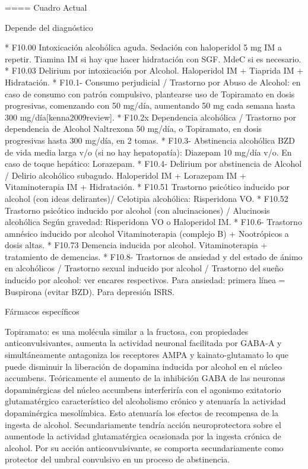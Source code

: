 \documentclass{scrbook}
\begin{document}
==== Cuadro Actual

Depende del diagnóstico

* F10.00 Intoxicación alcohólica aguda. Sedación con haloperidol 5 mg IM a repetir. Tiamina IM si hay que hacer hidratación con SGF. MdeC si es necesario.
* F10.03 Delirium por intoxicación por Alcohol. Haloperidol IM + Tiaprida IM + Hidratación.
* F10.1- Consumo perjudicial / Trastorno por Abuso de Alcohol: en caso de consumo con patrón compulsivo, plantearse uso de Topiramato en dosis progresivas, comenzando con 50 mg/día, aumentando 50 mg cada semana hasta 300 mg/día[kenna2009review].
* F10.2x Dependencia alcohólica / Trastorno por dependencia de Alcohol Naltrexona 50 mg/día, o Topiramato, en dosis progresivas hasta 300 mg/día, en 2 tomas.
* F10.3- Abstinencia alcohólica BZD de vida media larga v/o (si no hay hepatopatía): Diazepam 10 mg/día v/o. En caso de toque hepático: Lorazepam.
* F10.4- Delirium por abstinencia de Alcohol / Delirio alcohólico subagudo. Haloperidol IM + Lorazepam IM + Vitaminoterapia IM + Hidratación.
* F10.51 Trastorno psicótico inducido por alcohol (con ideas delirantes)/ Celotipia alcohólica: Risperidona VO.
* F10.52 Trastorno psicótico inducido por alcohol (con alucinaciones) / Alucinosis alcohólica Según gravedad: Risperidona VO o Haloperidol IM.
* F10.6- Trastorno amnésico inducido por alcohol Vitaminoterapia (complejo B) + Nootrópicos a dosis altas.
* F10.73 Demencia inducida por alcohol. Vitaminoterapia + tratamiento de demencias.
* F10.8- Trastornos de ansiedad y del estado de ánimo en alcohólicos / Trastorno sexual inducido por alcohol / Trastorno del sueño inducido por alcohol: ver encares respectivos. Para ansiedad: primera línea = Buspirona (evitar BZD). Para depresión ISRS.

Fármacos específicos

Topiramato: es una molécula similar a la fructosa, con propiedades anticonvulsivantes, aumenta la actividad neuronal facilitada por GABA-A y simultáneamente antagoniza los receptores AMPA y kainato-glutamato lo que puede disminuir la liberación de dopamina inducida por alcohol en el núcleo accumbens. Teóricamente el aumento de la inhibición GABA de las neuronas dopaminérgicas del núcleo accumbens interferiría con el agonismo exitatorio glutamatérgico característico del alcoholismo crónico y atenuaría la actividad dopaminérgica mesolímbica. Esto atenuaría los efectos de recompensa de la ingesta de alcohol. Secundariamente tendría acción neuroprotectora sobre el aumentode la actividad glutamatérgica ocasionada por la ingesta crónica de alcohol. Por su acción anticonvulsivante, se comporta secundariamente como protector del umbral convulsivo en un proceso de abstinencia.
\end{document}
